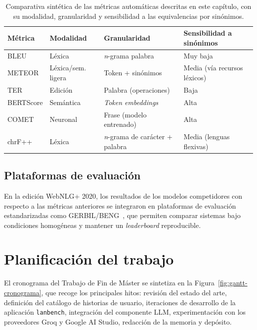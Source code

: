 \begin{table}[ht]
	\centering
	\footnotesize
	\begin{tabular}{llll}
		\hline
		\textbf{Métrica} & \textbf{Modalidad} & \textbf{Granularidad}                  & \textbf{Sensibilidad a sinónimos} \\
		\hline
		BLEU             & Léxica             & \textit{n}-grama palabra               & Muy baja                          \\
		METEOR           & Léxica/sem. ligera & Token + sinónimos                      & Media (vía recursos léxicos)      \\
		TER              & Edición            & Palabra (operaciones)                  & Baja                              \\
		BERTScore        & Semántica          & \textit{Token embeddings}              & Alta                              \\
		COMET            & Neuronal           & Frase (modelo entrenado)               & Alta                              \\
		chrF++           & Léxica             & \textit{n}-grama de carácter + palabra & Media (lenguas flexivas)          \\
		\hline
	\end{tabular}
	\caption{Comparativa sintética de las métricas automáticas descritas en este
		capítulo, con su modalidad, granularidad y sensibilidad a las
		equivalencias por sinónimos.}
	\label{tab:metricas-comparativa}
\end{table}

\subsection{Plataformas de evaluación}

En la edición WebNLG+ 2020, los resultados de los modelos competidores con
respecto a las métricas anteriores se integraron en plataformas de evaluación
estandarizadas como GERBIL/BENG~\cite{GERBIL,Usbeck2015}, que permiten comparar
sistemas bajo condiciones homogéneas y mantener un \textit{leaderboard}
reproducible.

\section{Planificación del trabajo}
\label{sec:planificacion-trabajo}

El cronograma del Trabajo de Fin de Máster se sintetiza en la
Figura~\ref{fig:gantt-cronograma}, que recoge los principales hitos: revisión
del estado del arte, definición del catálogo de historias de usuario,
iteraciones de desarrollo de la aplicación \texttt{lanbench}, integración del
componente LLM, experimentación con los proveedores Groq y Google AI Studio,
redacción de la memoria y depósito.

